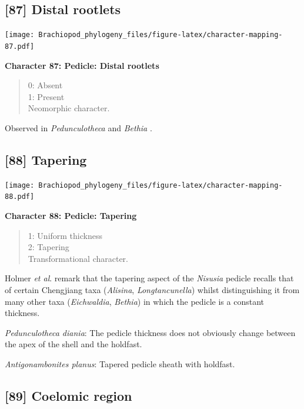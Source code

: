 \documentclass[]{book}
\theoremstyle{definition}
\theoremstyle{definition}
\theoremstyle{definition}
\theoremstyle{remark}
\begin{document}
\hypertarget{distal-rootlets}{%
\subsection*{{[}87{]} Distal rootlets}\label{distal-rootlets}}

\texttt{[image: Brachiopod\_phylogeny\_files/figure-latex/character-mapping-87.pdf]}

\textbf{Character 87: Pedicle: Distal rootlets}

\begin{quote}
0: Absent\\
1: Present\\
Neomorphic character.
\end{quote}

Observed in \emph{Pedunculotheca} and \emph{Bethia}
\citep{Sutton2005Silurianbrachiopods}.

\hypertarget{tapering}{%
\subsection*{{[}88{]} Tapering}\label{tapering}}

\texttt{[image: Brachiopod\_phylogeny\_files/figure-latex/character-mapping-88.pdf]}

\textbf{Character 88: Pedicle: Tapering}

\begin{quote}
1: Uniform thickness\\
2: Tapering\\
Transformational character.
\end{quote}

Holmer \emph{et al}. \citeyearpar{Holmer2018Theattachment} remark that
the tapering aspect of the \emph{Nisusia} pedicle recalls that of
certain Chengjiang taxa (\emph{Alisina}, \emph{Longtancunella}) whilst
distinguishing it from many other taxa (\emph{Eichwaldia},
\emph{Bethia}) in which the pedicle is a constant thickness.

\emph{Pedunculotheca diania}: The pedicle thickness does not obviously
change between the apex of the shell and the holdfast.

\emph{Antigonambonites planus}: Tapered pedicle sheath with holdfast.

\hypertarget{coelomic-region}{%
\subsection*{{[}89{]} Coelomic region}\label{coelomic-region}}
\end{document}
